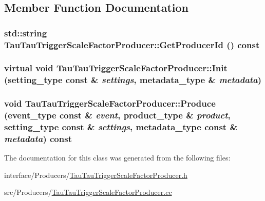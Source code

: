\subsection{Member Function Documentation}
\hypertarget{classTauTauTriggerScaleFactorProducer_a8a91047ac7da1cbb48177e212617d361}{
\subsubsection[{GetProducerId}]{\setlength{\rightskip}{0pt plus 5cm}std::string TauTauTriggerScaleFactorProducer::GetProducerId () const}}
\label{classTauTauTriggerScaleFactorProducer_a8a91047ac7da1cbb48177e212617d361}
\hypertarget{classTauTauTriggerScaleFactorProducer_a902203f3270c214095376e5d0df162d0}{
\subsubsection[{Init}]{\setlength{\rightskip}{0pt plus 5cm}virtual void TauTauTriggerScaleFactorProducer::Init (setting\_\-type const \& {\em settings}, \/  metadata\_\-type \& {\em metadata})}}
\label{classTauTauTriggerScaleFactorProducer_a902203f3270c214095376e5d0df162d0}
\hypertarget{classTauTauTriggerScaleFactorProducer_a17a3e0477edd35f3d4aef2ca763efe94}{
\subsubsection[{Produce}]{\setlength{\rightskip}{0pt plus 5cm}void TauTauTriggerScaleFactorProducer::Produce (event\_\-type const \& {\em event}, \/  product\_\-type \& {\em product}, \/  setting\_\-type const \& {\em settings}, \/  metadata\_\-type const \& {\em metadata}) const}}
\label{classTauTauTriggerScaleFactorProducer_a17a3e0477edd35f3d4aef2ca763efe94}


The documentation for this class was generated from the following files:\begin{DoxyCompactItemize}
\item 
interface/Producers/\hyperlink{TauTauTriggerScaleFactorProducer_8h}{TauTauTriggerScaleFactorProducer.h}\item 
src/Producers/\hyperlink{TauTauTriggerScaleFactorProducer_8cc}{TauTauTriggerScaleFactorProducer.cc}\end{DoxyCompactItemize}

